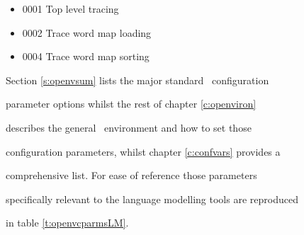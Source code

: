 

\begin{itemize}


\item 0001       Top level tracing


\item 0002       Trace word map loading


\item 0004       Trace word map sorting


\end{itemize}










Section \ref{s:openvsum} lists the major standard \HTK\ configuration


parameter options whilst the rest of chapter \ref{c:openviron}


describes the general \HTK\ environment and how to set those


configuration parameters, whilst chapter \ref{c:confvars} provides a


comprehensive list.  For ease of reference those parameters


specifically relevant to the language modelling tools are reproduced


in table \ref{t:openvcparmsLM}.





